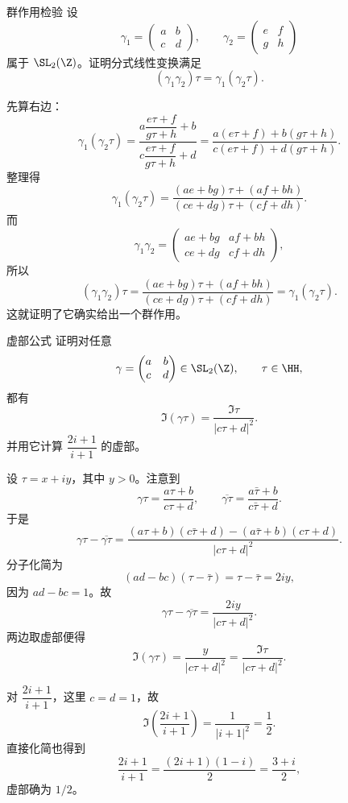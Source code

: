 \begin{problem}{群作用检验}
\easy
设
\[
\gamma_1=\begin{pmatrix}a&b\\c&d\end{pmatrix},\qquad
\gamma_2=\begin{pmatrix}e&f\\g&h\end{pmatrix}
\]
属于 $\SL_2(\Z)$。证明分式线性变换满足
\[
(\gamma_1\gamma_2)\tau=\gamma_1(\gamma_2\tau).
\]
\end{problem}
\begin{solution}
先算右边：
\[
\gamma_1(\gamma_2\tau)=
\frac{a\dfrac{e\tau+f}{g\tau+h}+b}{c\dfrac{e\tau+f}{g\tau+h}+d}
=\frac{a(e\tau+f)+b(g\tau+h)}{c(e\tau+f)+d(g\tau+h)}.
\]
整理得
\[
\gamma_1(\gamma_2\tau)=
\frac{(ae+bg)\tau+(af+bh)}{(ce+dg)\tau+(cf+dh)}.
\]
而
\[
\gamma_1\gamma_2=
\begin{pmatrix}ae+bg&af+bh\\ce+dg&cf+dh\end{pmatrix},
\]
所以
\[
(\gamma_1\gamma_2)\tau=
\frac{(ae+bg)\tau+(af+bh)}{(ce+dg)\tau+(cf+dh)}=
\gamma_1(\gamma_2\tau).
\]
这就证明了它确实给出一个群作用。
\end{solution}

\begin{problem}{虚部公式}
\easy
证明对任意
\[
\gamma=\begin{pmatrix}a&b\\c&d\end{pmatrix}\in \SL_2(\Z),\qquad \tau\in \HH,
\]
都有
\[
\Im(\gamma\tau)=\frac{\Im \tau}{|c\tau+d|^2}.
\]
并用它计算 $\dfrac{2i+1}{i+1}$ 的虚部。
\end{problem}
\begin{solution}
设 $\tau=x+iy$，其中 $y>0$。注意到
\[
\gamma\tau=\frac{a\tau+b}{c\tau+d},\qquad
\overline{\gamma\tau}=\frac{a\bar\tau+b}{c\bar\tau+d}.
\]
于是
\[
\gamma\tau-\overline{\gamma\tau}
=\frac{(a\tau+b)(c\bar\tau+d)-(a\bar\tau+b)(c\tau+d)}{|c\tau+d|^2}.
\]
分子化简为
\[
(ad-bc)(\tau-\bar\tau)=\tau-\bar\tau=2iy,
\]
因为 $ad-bc=1$。故
\[
\gamma\tau-\overline{\gamma\tau}=\frac{2iy}{|c\tau+d|^2}.
\]
两边取虚部便得
\[
\Im(\gamma\tau)=\frac{y}{|c\tau+d|^2}=\frac{\Im\tau}{|c\tau+d|^2}.
\]

对 $\dfrac{2i+1}{i+1}$，这里 $c=d=1$，故
\[
\Im\!\left(\frac{2i+1}{i+1}\right)=\frac{1}{|i+1|^2}=\frac{1}{2}.
\]
直接化简也得到
\[
\frac{2i+1}{i+1}=\frac{(2i+1)(1-i)}{2}=\frac{3+i}{2},
\]
虚部确为 $1/2$。
\end{solution}

